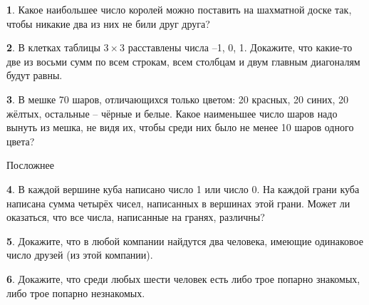\documentclass[b5paper,usehyperref, twoside]{article}
\theoremstyle{definition}
\theoremstyle{definition}
\newtheorem{Task}{}
\begin{document}
	\begin{Task} 
		 Какое наибольшее число королей можно поставить на шахматной доске так, чтобы никакие два из них не били друг друга?
	 \end{Task}
	
	\begin{Task} 
		В клетках таблицы $3 \times 3$ расставлены числа –1, 0, 1. Докажите, что какие-то две из восьми сумм по всем строкам, всем столбцам и двум главным диагоналям будут равны.
	 \end{Task}

	\begin{Task} 
		В мешке 70 шаров, отличающихся только цветом: 20 красных, 20 синих, 20 жёлтых, остальные – чёрные и белые. 
		Какое наименьшее число шаров надо вынуть из мешка, не видя их, чтобы среди них было не менее 10 шаров одного цвета?
	\end{Task}
	
	
	
	
	\centerline{\LARGE Посложнее}
	
	\begin{Task} 
		В каждой вершине куба написано число 1 или число 0. На каждой грани куба написана сумма четырёх чисел, написанных в вершинах этой грани. Может ли оказаться, что все числа, написанные на гранях, различны? 
	\end{Task}

%	
	
	\begin{Task} 
		Докажите, что в любой компании найдутся два человека, имеющие одинаковое число друзей (из этой компании).
	 \end{Task}
	
	\begin{Task} 
		Докажите, что среди любых шести человек есть либо трое попарно знакомых, либо трое попарно незнакомых.
	 \end{Task}
	

	
\end{document}
